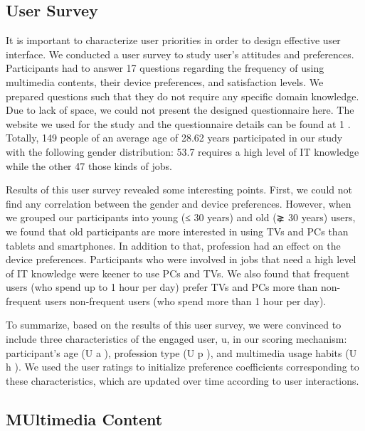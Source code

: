 \documentclass[runningheads,a4paper]{llncs}
\begin{document}
\subsection{User Survey}

It is important to characterize user priorities in order to design effective user
interface. We conducted a user survey to study user’s attitudes and preferences.
Participants had to answer 17 questions regarding the frequency of using multimedia contents, their device preferences, and satisfaction levels. We prepared
questions such that they do not require any specific domain knowledge. Due to
lack of space, we could not present the designed questionnaire here. The website
we used for the study and the questionnaire details can be found at 1
. Totally,
149 people of an average age of 28.62 years participated in our study with the
following gender distribution: 53.7%
requires a high level of IT knowledge while the other 47%
those kinds of jobs.



Results of this user survey revealed some interesting points. First, we could
not find any correlation between the gender and device preferences. However,
when we grouped our participants into young (≤ 30 years) and old (⪈ 30 years)
users, we found that old participants are more interested in using TVs and PCs
than tablets and smartphones. In addition to that, profession had an effect on
the device preferences. Participants who were involved in jobs that need a high
level of IT knowledge were keener to use PCs and TVs. We also found that
frequent users (who spend up to 1 hour per day) prefer TVs and PCs more than
non-frequent users non-frequent users (who spend more than 1 hour per day).



To summarize, based on the results of this user survey, we were convinced to
include three characteristics of the engaged user, u, in our scoring mechanism:
participant’s age (U
a
), profession type (U
p
), and multimedia usage habits (U
h
).
We used the user ratings to initialize preference coefficients corresponding to
these characteristics, which are updated over time according to user interactions.



\subsection{MUltimedia Content}
\end{document}
